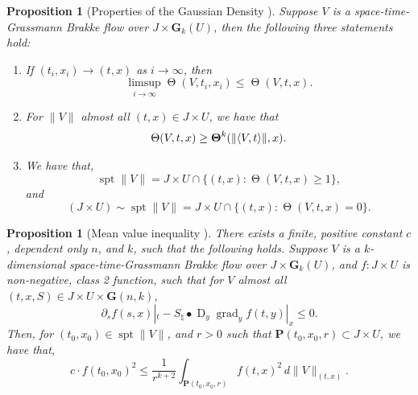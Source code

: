 \documentclass{article}
\theoremstyle{plain}
\theoremstyle{definition}
\theoremstyle{plain}
\newtheorem{proposition}[theorem]{Proposition}
\theoremstyle{remark}
\theoremstyle{remark}
\theoremstyle{plain}
\DeclareMathOperator{\spt}{spt}
\DeclareMathOperator{\D}{D}
\DeclareMathOperator*{\Density}{\boldsymbol{\rm \Theta}}
\DeclareMathOperator{\GDensity}{\Theta}
\DeclareMathOperator{\grad}{grad}
\begin{document}
\begin{proposition}[Properties of the Gaussian Density ]\label{prop:properties of Gaussian density}
    Suppose $V$ is a space-time-Grassmann Brakke flow over $J \times \mathbf{G}_{k} (U)$, then the following three statements hold: 
    \begin{enumerate}[label=\ref{prop:properties of Gaussian density}.\arabic{enumi}]
        \item \label{prop:properties of Gaussian density:1} If $(t_i,x_i) \to (t,x)$ as $i\to\infty$, then 
        \[ \limsup \limits_{i\to\infty} \GDensity(V,t_i,x_i) \leq \GDensity(V,t,x).\]
        \item \label{prop:properties of Gaussian density:2} For $\| V \|$ almost all $(t, x) \in J \times U$, we have that
        \begin{equation*}
            \Theta (V, t, x) \geq \textstyle \Density^{k} (\| \langle V, t \rangle \|, x).
        \end{equation*}
        \item \label{prop:properties of Gaussian density:3} We have that, 
        \begin{equation*}
            \spt  \| V \| =  J \times U \cap \{ (t, x) \colon \GDensity (V, t, x) \geq 1\} ,
        \end{equation*}
        and
        \begin{equation*}
            (J \times U) \sim \spt \| V \| = J \times U \cap \{ (t, x) \colon \GDensity (V, t, x) = 0 \}.
        \end{equation*}
    \end{enumerate}
\end{proposition}


\begin{proposition}[Mean value inequality ]\label{prop: Brakke flow mean value inequality}
    There exists a finite, positive constant $c$, dependent only $n$, and $k$, such that the following holds. 
    Suppose $V$ is a $k$-dimensional space-time-Grassmann Brakke flow over $J \times \mathbf{G}_{k} (U)$, and $f \colon J \times U$ is non-negative, class 2 function, such that for $V$ almost all $(t, x, S) \in J \times U \times\mathbf{G} (n, k)$, 
    \begin{equation*}
        \partial_{s} f (s, x)|_{t} - S_{\natural} \bullet \D_{y} \grad_{y} f (t, y)|_{x} \leq 0.
    \end{equation*}
    Then, for $(t_{0}, x_{0}) \in  \spt \| V \| $, and $r > 0$  such that $\mathbf{P} (t_{0}, x_{0}, r) \subset J \times U$, we have that, 
    \begin{equation*}
       \textstyle  c \cdot f (t_{0}, x_{0})^{2} \leq \frac{1}{r^{k + 2}} \int_{\mathbf{P} (t_{0}, x_{0}, r)} f(t, x)^{2} \, d \| V \|_{(t, x)}.
    \end{equation*}
\end{proposition}
\end{document}
